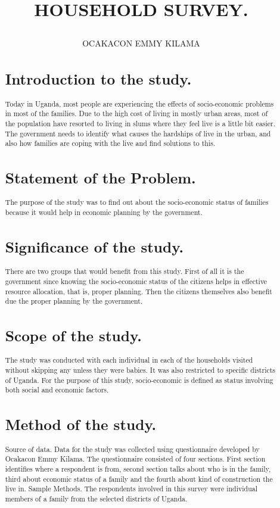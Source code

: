 \documentclass[]{report}
\title{\begin{Huge}
		HOUSEHOLD SURVEY.
	\end{Huge}}
\author{OCAKACON EMMY KILAMA}
\begin{document}
\maketitle

\begin{abstract}
	\section{Introduction to the study.}
	Today in Uganda, most people are experiencing the effects of socio-economic problems in most of the families. Due to the high cost of living in mostly urban areas, most of the population have resorted to living in slums where they feel live is a little bit easier. The government needs to identify what causes the hardships of live in the urban, and also how families are coping with the live and find solutions to this.
	
	\section{Statement of the Problem.}
	The purpose of the study was to find out about the socio-economic status of families because it would help in economic planning by the government.
	
	\section{Significance of the study.}
	There are two groups that would benefit from this study. First of all it is the government since knowing the socio-economic status of the citizens helps in effective resource allocation, that is, proper planning. Then the citizens themselves also benefit due the proper planning by the government.
	
	\section{Scope of the study.}
	The study was conducted with each individual in each of the households visited without skipping any unless they were babies. It was also restricted to specific districts of Uganda. For the purpose of this study, socio-economic is defined as status involving both social and economic factors.
	
	\section{Method of the study.}
	Source of data.
	Data for the study was collected using questionnaire developed by Ocakacon Emmy Kilama. The questionnaire consisted of four sections. First section identifies where a respondent is from, second section talks about who is in the family, third about economic status of a family and the fourth about kind of construction the live in.
	Sample Methods.
	The respondents involved in this survey were individual members of a family from the selected districts of Uganda.
	

\end{abstract}
\end{document}
